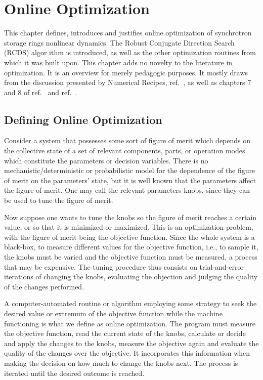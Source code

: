\chapter{Online Optimization}
This chapter defines, introduces and justifies online optimization  of synchrotron storage rings nonlinear dynamics. The Robust Conjugate Direction Search (RCDS) algor ithm is introduced, as well as the other optimization routines from which it was built upon. This chapter adds no novelty to the literature in optimization. It is an overview for merely pedagogic purposes. It mostly draws from the discussion presented by Numerical Recipes, ref.~\cite{press_numerical_2007}, as well as chapters 7 and 8 of ref.~\cite{huang_beam-based_2019} and ref.~\cite{huang_algorithm_2013}.
\section{Defining Online Optimization}
Consider a system that possesses some sort of figure of merit which depends on the collective state of a set of relevant components, parts, or operation modes which constitute the  parameters or decision variables. There is no mechanistic/deterministic or probabilistic model for the dependence of the figure of merit on the parameters' state, but it is well known that the parameters affect the figure of merit. One may call the relevant parameters knobs, since they can be used to tune the figure of merit.

Now suppose one wants to tune the knobs so the figure of merit reaches a certain value, or so that it is minimized or maximized. This is an optimization problem, with the figure of merit being the objective function. Since the whole system is a black-box, to measure different values for the objective function, i.e., to sample it, the knobs must be varied and the objective function must be measured, a process that may be expensive. The tuning procedure thus consists on trial-and-error iterations of changing the knobs, evaluating the objection and judging the quality of the changes performed.

A computer-automated routine or algorithm employing some strategy to seek the desired value or extremum of the objective function while the machine functioning is what we define as online optimization. The program must measure the objective function, read the current state of the knobs, calculate or decide and apply the changes to the knobs, measure the objective again and evaluate the quality of the changes over the objective. It incorporates this information when making the decision on how much to change the knobs next. The process is iterated until the desired outcome is reached.

